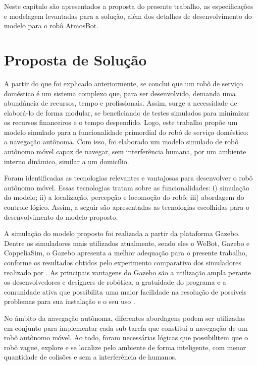 Neste capítulo são apresentados a proposta do presente trabalho, as especificações e modelagem levantadas para a solução, além dos detalhes de desenvolvimento do modelo para o robô AtmosBot.

\section{Proposta de Solução} 

A partir do que foi explicado anteriormente, se conclui que um robô de serviço doméstico é um sistema complexo que,  para ser desenvolvido, demanda uma abundância de recursos, tempo e profissionais. Assim, surge a necessidade de elaborá-lo de forma modular, se beneficiando de testes simulados para minimizar os recursos financeiros e o tempo despendido. Logo, este trabalho propõe um modelo simulado para a funcionalidade primordial do robô de serviço doméstico: a navegação autônoma. Com isso, foi elaborado um modelo simulado de robô autônomo móvel capaz de navegar, sem interferência humana, por um ambiente interno dinâmico, similar a um domicílio. 

Foram identificadas as tecnologias relevantes e vantajosas para desenvolver o robô autônomo móvel. Essas tecnologias tratam sobre as funcionalidades: i) simulação do modelo; ii) a localização, percepção e locomoção do robô; iii) abordagem do controle lógico. Assim, a seguir são apresentadas as tecnologias escolhidas para o desenvolvimento do modelo proposto.

A simulação do modelo proposto foi realizada a partir da plataforma Gazebo. Dentre os simuladores mais utilizados atualmente, sendo eles o WeBot, Gazebo e CoppeliaSim, o Gazebo apresenta a melhor adequação para o presente trabalho, conforme os resultados obtidos pelo experimento comparativo dos simuladores realizado por \citet{pickSimulatorFarley:2022}. As principais vantagens do Gazebo são a utilização ampla perante os desenvolvedores e designers de robótica, a gratuidade do programa e a comunidade ativa que possibilita uma maior facilidade na resolução de possíveis problemas para sua instalação e o seu uso \cite{gazeboDesigns:2004, pickSimulatorFarley:2022}. 

No âmbito da navegação autônoma, diferentes abordagens podem ser utilizadas em conjunto para implementar cada sub-tarefa que constitui a navegação de um robô autônomo móvel. Ao todo, foram necessárias lógicas que possibilitem que o robô vague, explore e se localize pelo ambiente de forma inteligente, com menor quantidade de colisões e sem a interferência de humanos.

